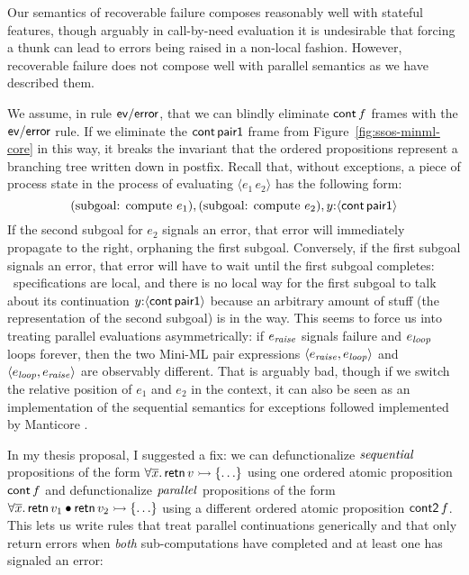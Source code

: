 Our semantics of recoverable failure composes reasonably well with
stateful features, though arguably in call-by-need
evaluation it is undesirable that forcing a thunk can lead to errors
being raised in a non-local fashion. However,
recoverable failure does not compose well with parallel semantics as
we have described them. 

We assume, in rule ${\sf ev/error}$, that we can blindly eliminate
${\sf cont}\,f$ frames with the ${\sf ev/error}$ rule.  If we
eliminate the ${\sf cont}\,{\sf pair1}$ frame from
Figure~\ref{fig:ssos-minml-core} in this way, it breaks the invariant
that the ordered propositions represent a branching tree written down
in postfix. Recall that, without exceptions, a piece of process state
in the process of evaluating $\langle e_1\,e_2\rangle$ has the
following form:
\[
\mbox{(subgoal: compute $e_1$)},
\mbox{(subgoal: compute $e_2$)},
y{:}\langle {{\sf cont}\,{\sf pair1}} \rangle 
\]
If the second subgoal for $e_2$ signals an error, that error will
immediately propagate to the right, orphaning the first subgoal.
Conversely, if the first subgoal signals an error, that error will
have to wait until the first subgoal completes: \sls~specifications
are local, and there is no local way for the first subgoal to talk
about its continuation $y{:}\langle {{\sf cont}\,{\sf pair1}} \rangle$ because an
arbitrary amount of stuff (the representation of the second subgoal)
is in the way. This seems to force us into treating parallel
evaluations asymmetrically: if $e_{\it raise}$ signals failure and
$e_{\it loop}$ loops forever, then the two Mini-ML pair expressions
$\langle e_{\it raise}, e_{\it loop} \rangle$ and $\langle e_{\it
  loop}, e_{\it raise} \rangle$ are observably different. That is arguably
bad, though if we switch the relative position of $e_1$ and $e_2$
in the context, it can also be seen as an implementation of the
sequential semantics for exceptions followed implemented by Manticore
\cite{fluet08scheduling}.

In my thesis proposal, I suggested a fix: we can defunctionalize ${\it
  sequential}$ propositions of the form $\forall \overline{x}.\,{\sf
  retn}\,v \rightarrowtail \{\ldots \}$ using one ordered atomic proposition
${\sf cont}\,f$ and defunctionalize ${\it parallel}$ propositions of
the form $\forall \overline{x}.\,{\sf retn}\,v_1 \mathbin{\bullet} {\sf retn}\,v_2
\rightarrowtail \{\ldots \}$ using a different ordered atomic proposition ${\sf
  cont2}\,f$. This lets us write rules that treat parallel continuations
generically and that only return errors when {\it both} sub-computations
have completed and at least one has signaled an error: 

